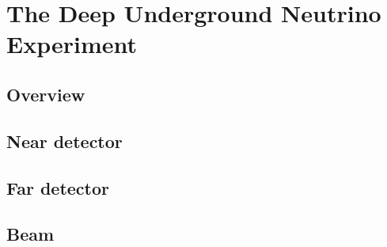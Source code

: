 \chapter{The Deep Underground Neutrino Experiment}
\label{ch:dune}

\section{Overview}
\blindtext

\section{Near detector}
\blindtext

\section{Far detector}
\blindtext

\section{Beam}
\blindtext
